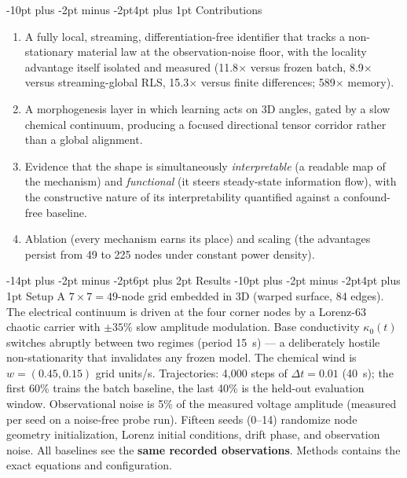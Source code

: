 \documentclass[10pt]{article}
\makeatletter
\renewcommand\section{\@startsection{section}{1}{\z@}%
  {-14pt plus -2pt minus -2pt}{6pt plus 2pt}%
  {\normalfont\bfseries\large}}
\renewcommand\subsection{\@startsection{subsection}{2}{\z@}%
  {-10pt plus -2pt minus -2pt}{4pt plus 1pt}%
  {\normalfont\bfseries\normalsize}}
\makeatother
\begin{document}
\subsection{Contributions}
\begin{enumerate}
\item A fully local, streaming, differentiation-free identifier that tracks a
non-stationary material law at the observation-noise floor, with the locality advantage
itself isolated and measured (11.8$\times$ versus frozen batch, 8.9$\times$ versus
streaming-global RLS, 15.3$\times$ versus finite differences; 589$\times$ memory).
\item A morphogenesis layer in which learning acts on 3D angles, gated by a slow
chemical continuum, producing a focused directional tensor corridor rather than a
global alignment.
\item Evidence that the shape is simultaneously \emph{interpretable} (a readable map of
the mechanism) and \emph{functional} (it steers steady-state information flow), with the
constructive nature of its interpretability quantified against a confound-free baseline.
\item Ablation (every mechanism earns its place) and scaling (the advantages persist
from 49 to 225 nodes under constant power density).
\end{enumerate}

\section{Results}
\subsection{Setup}
A $7 \times 7 = 49$-node grid embedded in 3D (warped surface, 84 edges). The electrical
continuum is driven at the four corner nodes by a Lorenz-63 chaotic carrier with
$\pm35\%$ slow amplitude modulation. Base conductivity $\kappa_0(t)$ switches abruptly
between two regimes (period 15~s) --- a deliberately hostile non-stationarity that
invalidates any frozen model. The chemical wind is $w = (0.45, 0.15)$ grid units/s.
Trajectories: 4{,}000 steps of $\Delta t = 0.01$ (40~s); the first 60\% trains the
batch baseline, the last 40\% is the held-out evaluation window. Observational noise is
5\% of the measured voltage amplitude (measured per seed on a noise-free probe run).
Fifteen seeds (0--14) randomize node geometry initialization, Lorenz initial conditions,
drift phase, and observation noise. All baselines see the \textbf{same recorded
observations}. Methods contains the exact equations and configuration.
\end{document}

